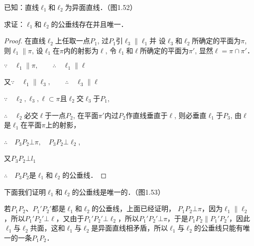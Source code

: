   \begin{example}
    已知：直线$\ell_1$和$\ell_2$为异面直线．（图1.52）
  
  求证：$\ell_1$和$\ell_2$的公垂线存在并且唯一．
  \end{example}
  
  \begin{proof}
  在直线$\ell_2$上任取一点$P_1$, 过$P_1$引$\ell_3\parallel \ell_1$并
  设$\ell_3$和$\ell_2$所确定的平面为$\pi$, 则$\ell_1\parallel\pi$, 设$\ell_1$在$\pi$内的射影为$\ell$, 令$\ell_1$和$\ell$所确定的平面为$\pi'$, 显然$\ell=\pi\cap \pi'$．
  
  $\because \quad \ell_1\parallel \pi,\qquad \therefore\quad \ell_1\parallel \ell$
  
  又$\because\quad \ell_1\parallel \ell_3,\qquad \therefore\quad \ell_3\parallel \ell$
  
  $\because\quad \ell_2,\ell_3,\ell\subset \pi$且$\ell_2$交$\ell_3$于$P_1$, 
  
  $\therefore\quad \ell_2$必交$\ell$于一点$P_2$, 在平面$\pi'$内过$P_2$作直线垂直于$\ell$, 则必垂直$\ell_1$于$P_3$, 由$\ell$是$\ell_1$在平面$\pi$上的射影，
  
  $\therefore\quad P_3P_2\bot\pi,\quad P_3P_2\bot \ell_2$, 
  
  又$P_3P_2\bot l_1$
  
  $\therefore\quad P_3P_2$是$\ell_1$和$\ell_2$的公垂线． 
  \end{proof}
  
  下面我们证明$\ell_1$和$\ell_2$的公垂线是唯一的．（图1.53）
  
  \begin{figure}[htp]
    \centering
    \caption{}
  \end{figure}
  
  若$P_1P_2$、$P_1'P_2'$都是$\ell_1$和$\ell_2$的公垂线，上面已经证明，
  $P_1P_2\bot\pi$，因为$\ell_1\parallel \ell_2$，所以$P_1'P_2'\bot\ell$，又由于$P_1'P_2'\bot \ell_2$，所以$P_1'P_2'\bot \pi$，于是$P_1P_2\parallel P_1'P_2'$，因此$\ell_1$与$\ell_2$共面，这和$\ell_1$与$\ell_2$是异面直线相矛盾，所以$\ell_1$与$\ell_2$的公垂线只能有唯一的一条$P_1P_2$．
  
